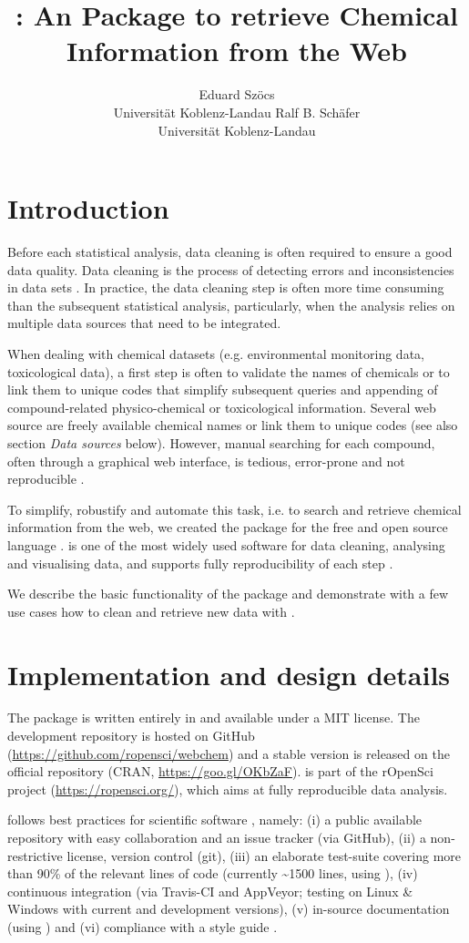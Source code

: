\documentclass[article, shortnames]{jss}\usepackage[]{graphicx}\usepackage[]{color}
\author{Eduard Sz\"ocs\\Universit\"at Koblenz-Landau \And 
        Ralf B. Sch\"afer\\Universit\"at Koblenz-Landau}
\title{\pkg{webchem}: An \proglang{R} Package to retrieve Chemical Information from the Web}
\begin{document}
\section[Introduction]{Introduction}
Before each statistical analysis, data cleaning is often required to ensure a good data quality.
Data cleaning is the process of detecting errors and inconsistencies in data sets \citep{Chapman_2005}.
In practice, the data cleaning step is often more time consuming than the subsequent statistical analysis, particularly, when the analysis relies on multiple data sources that need to be integrated.

When dealing with chemical datasets (e.g. environmental monitoring data, toxicological data), a first step is often to validate the names of chemicals or to link them to unique codes that simplify subsequent queries and appending of compound-related physico-chemical or toxicological information.
Several web source are freely available chemical names or link them to unique codes (see also section \emph{Data sources} below).
However, manual searching for each compound, often through a graphical web interface, is tedious, error-prone and not reproducible \citep{Peng_2009}.

To simplify, robustify and automate this task, i.e. to search and retrieve chemical information from the web, we created the  package for the free and open source  language \citep{r_2015, Wehrens_2011}.
 is one of the most widely used software for data cleaning, analysing and visualising data, and supports fully reproducibility of each step \citep{Marwick_2016}.

We describe the basic functionality of the package and demonstrate with a few use cases how to clean and retrieve new data with .


\section[Implementation and design details]{Implementation and design details}
The  package is written entirely in  and available under a MIT license.
The development repository is hosted on GitHub (\url{https://github.com/ropensci/webchem}) and a stable version is released on the official  repository (CRAN, \url{https://goo.gl/OKbZaF}).
 is part of the rOpenSci project (\url{https://ropensci.org/}), which aims at fully reproducible data analysis.

 follows best practices for scientific software \citep{wilson_best_2014, poisot_best_2015}, namely: (i) a public available repository with easy collaboration and an issue tracker (via GitHub), (ii) a non-restrictive license, version control (git), (iii) an elaborate test-suite covering more than 90\% of the relevant lines of code (currently \textasciitilde 1500 lines, using  \citep{wickham_testthat:_2011}), (iv) continuous integration (via Travis-CI and AppVeyor; testing on Linux \& Windows with current and development  versions), (v) in-source documentation (using  \citep{wickham_roxygen2:_2015}) and (vi) compliance with a style guide \citep{wickham_advanced_2015}.
\end{document}
